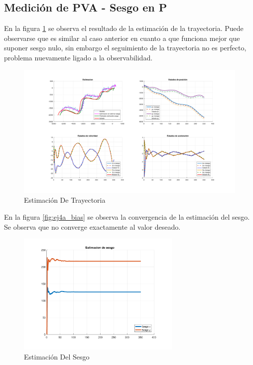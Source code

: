 \subsection{Medición de PVA - Sesgo en P}

	En la figura \ref{fig:ej4b} se observa el resultado de la estimación de la trayectoria. Puede observarse que es similar al caso anterior en cuanto a que funciona mejor que suponer sesgo nulo, sin embargo el seguimiento de la trayectoria no es perfecto, problema nuevamente ligado a la observabilidad.

	\begin{figure}[H]
		\centering
		\includegraphics[width=1.0\textwidth,keepaspectratio]{Figuras/graf_ej4b.pdf}
		\caption{Estimación De Trayectoria}
		\label{fig:ej4b}
	\end{figure}
	
	En la figura \ref{fig:ej4a_bias} se observa la convergencia de la estimación del sesgo. Se observa que no converge exactamente al valor deseado.
	
	\begin{figure}[H]
		\centering
		\includegraphics[width=0.7\textwidth,keepaspectratio]{Figuras/bias_ej4b.pdf}
		\caption{Estimación Del Sesgo}
		\label{fig:ej4b_bias}
	\end{figure}
	
